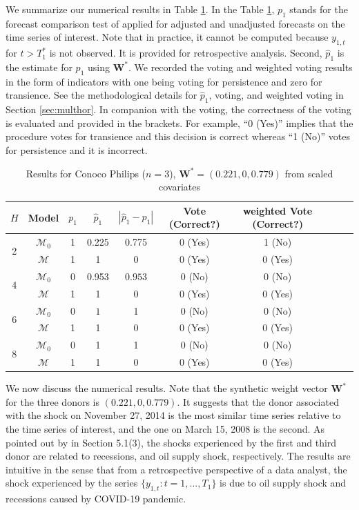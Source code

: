 \documentclass[11pt]{article}
\def\mbf#1{\mathbf{#1}} %
\def\mc#1{\mathcal{#1}} %
\def\mc#1{\mathcal{#1}}
\theoremstyle{definition}
\begin{document}
We summarize our numerical results in Table \ref{coptable}. In the Table \ref{coptable}, $p_1$ stands for the forecast comparison test of \cite{quaedvlieg2021multi} applied for adjusted and unadjusted forecasts on the time series of interest. Note that in practice, it cannot be computed because  $y_{1, t}$ for $t > T_1^*$ is not observed. It is provided   for retrospective  analysis. Second, $\hat{p}_1$ is the  estimate for $p_1$ using $\mbf{W}^*$.  We recorded the voting and weighted voting results in the form of indicators with one being voting for persistence and zero for transience. See the methodological details for $\hat{p}_1$, voting, and weighted voting in Section \ref{sec:multhor}. In companion with the voting, the correctness of the voting is evaluated and provided  in the brackets. For example, ``0 (Yes)'' implies  that the procedure votes for transience and this decision is correct whereas ``1 (No)'' votes for persistence and it is incorrect. 


\begin{table}[H]
	\caption{Results for Conoco Philips ($n=3$), $\mbf{W}^* = (0.221, 0, 0.779)$ from scaled covariates} \label{coptable}
\begin{center}
  \begin{tabular}{cccccccccr}
     $H$  & Model &   $p_1$ & $\hat{p}_1$ & $|\hat{p}_1-p_1|$ & Vote (Correct?) & weighted Vote (Correct?)   \\
     \hline 
     \multirow{2}{*}{2} & $\mc{M}_0$  &   1 & 0.225  & 0.775 & 0 (Yes) & 1 (No)  \\      
      & $\mc{M}$  & 1 & 1 & $0$   & 0 (Yes) &0 (Yes)   \\[.2cm]
     \multirow{2}{*}{4} & $\mc{M}_0$ &   0 & 0.953  & $0.953$ & 0 (No) &0 (No)    \\
      &  $\mc{M}$ & 1& 1 & 0 &0 (Yes)  &0 (Yes)  \\[.2cm]
     \multirow{2}{*}{6} &  $\mc{M}_0$ &   0   & $1$ & 1 & 0 (No) &0 (No)   \\
      &  $\mc{M}$ & 1 & 1  & 0 &0 (Yes) & 0 (Yes) \\[.2cm]
     \multirow{2}{*}{8} & $\mc{M}_0$ & 0  & 1 & 1 & 0 (No) & 0 (No)\\
     & $\mc{M}$ & 1 & 1 & 0 & 0 (Yes) & 0 (Yes)
  \end{tabular}
\end{center}	
\end{table}


We now discuss the numerical results. Note that the synthetic weight vector $\mbf{W}^*$ for the three donors is $(0.221, 0, 0.779)$. It suggests that the donor associated with the shock on November 27, 2014 is the most similar time series relative to the time series of interest, and the one on March 15, 2008 is the second. As pointed out by \cite{lin2021minimizing} in Section 5.1(3), the shocks experienced by the first and  third donor are related to recessions, and oil supply shock, respectively. The results are intuitive in the sense that from a retrospective perspective of a data analyst, the shock experienced by the series $\{y_{1,t}\colon t = 1, \ldots, T_1\}$ is due to oil supply shock and recessions caused by COVID-19 pandemic.
\end{document}
